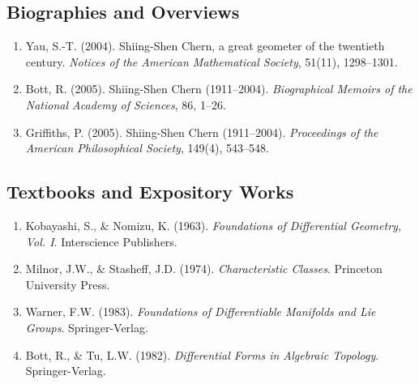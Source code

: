 \subsection*{Biographies and Overviews}
\begin{enumerate}
    \item Yau, S.-T. (2004). Shiing-Shen Chern, a great geometer of the twentieth century. \textit{Notices of the American Mathematical Society}, 51(11), 1298--1301.
    \item Bott, R. (2005). Shiing-Shen Chern (1911--2004). \textit{Biographical Memoirs of the National Academy of Sciences}, 86, 1--26.
    \item Griffiths, P. (2005). Shiing-Shen Chern (1911--2004). \textit{Proceedings of the American Philosophical Society}, 149(4), 543--548.
\end{enumerate}

\subsection*{Textbooks and Expository Works}
\begin{enumerate}
    \item Kobayashi, S., \& Nomizu, K. (1963). \textit{Foundations of Differential Geometry, Vol. I}. Interscience Publishers.
    \item Milnor, J.W., \& Stasheff, J.D. (1974). \textit{Characteristic Classes}. Princeton University Press.
    \item Warner, F.W. (1983). \textit{Foundations of Differentiable Manifolds and Lie Groups}. Springer-Verlag.
    \item Bott, R., \& Tu, L.W. (1982). \textit{Differential Forms in Algebraic Topology}. Springer-Verlag.
\end{enumerate}
